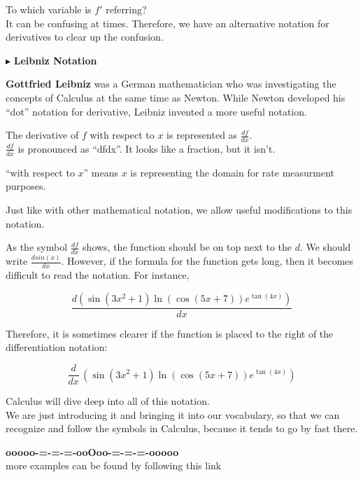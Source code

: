 \documentclass{ximera}
\begin{document}
To which variable is $f'$ referring? \\






It can be confusing at times.  Therefore, we have an alternative notation for derivatives to clear up the confusion.



$\blacktriangleright$  \textbf{\textcolor{purple!85!blue}{Leibniz Notation}}


\textbf{Gottfried Leibniz} was a German mathematician who was investigating the concepts of Calculus at the same time as Newton.  While Newton developed his ``dot'' notation for derivative, Leibniz invented a more useful notation.


The derivative of $f$ with respect to $x$ is represented as $\frac{df}{dx}$. \\

$\frac{df}{dx}$ is pronounced as ``dfdx''.  It looks like a fraction, but it isn't.


``with respect to $x$'' means $x$ is representing the domain for rate measurment purposes. 



\begin{notation}


Just like with other mathematical notation, we allow useful modifications to this notation.



As the symbol $\frac{df}{dx}$ shows, the function should be on top next to the $d$.    We should write $\frac{d sin(x)}{dx}$.  However, if the formula for the function gets long, then it becomes difficult to read the notation. For instance,

\[
\frac{d (\sin(3x^2+1)\ln(\cos(5x+7))e^{\tan(4x)})}{dx}
\]


Therefore, it is sometimes clearer if the function is placed to the right of the differentiation notation:




\[
\frac{d}{dx} \, (\sin(3x^2+1)\ln(\cos(5x+7))e^{\tan(4x)})
\]






\end{notation}




Calculus will dive deep into all of this notation. \\

We are just introducing it and bringing it into our vocabulary, so that we can recognize and follow the symbols in Calculus, because it tends to go by fast there.










\begin{center}
\textbf{\textcolor{green!50!black}{ooooo-=-=-=-ooOoo-=-=-=-ooooo}} \\

more examples can be found by following this link\\ 

\end{center}
\end{document}
